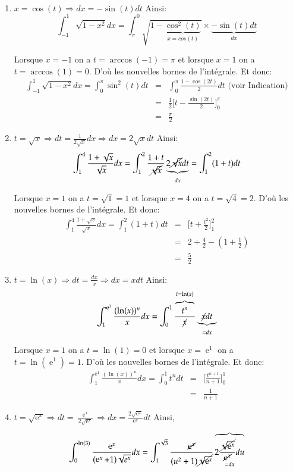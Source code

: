 \documentclass{article}%
\newenvironment{questions}{\begin{enumerate}}{\end{enumerate}}
\DeclareMathOperator{\e}{e} %
\begin{document}
\begin{correction}
  ~\\
  \begin{questions}
  \item $x = \cos(t) \Rightarrow dx = -\sin(t)dt$
    Ainsi:
    \[
      \int_{-1}^{1} \sqrt{1-x^2} dx
      = \int_{\pi}^{0} \sqrt{1-\underbrace{\cos^2(t)}_{x=cos(t)}}
      \times \underbrace{-\sin(t) dt}_{dx} 
    \]

    Lorsque $x=-1$ on a $t = \arccos(-1) = \pi$ et lorsque $x=1$ on a
    $t=\arccos(1) = 0$. D'où les nouvelles bornes de l'intégrale.
    Et donc:
    \begin{eqnarray*} 
      \int_{-1}^{1} \sqrt{1-x^2} dx = \int_0^{\pi} \sin^2(t) dt
      &=& \int_0^{\pi} \frac{1 - \cos(2t)}{2}dt \text{ (voir
          Indication)} \\
      &=& \frac{1}{2}\big[ t - \frac{\sin(2t)}{2} \big]_0^{\pi}\\
      &=& \frac{\pi}{2}
    \end{eqnarray*}
  \item $t=\sqrt{x} \Rightarrow dt = \frac{1}{2\sqrt{x}}dx \Rightarrow dx =
    2\sqrt{x}dt$ Ainsi:
    \[
      \int_{1}^{4} \frac{1+\sqrt{x}}{\sqrt{x}}dx =
      \int_{1}^{2} \frac{1+t}{\cancel{\sqrt{x}}} \underbrace{2
        \cancel{\sqrt{x}} dt}_{dx}
      = \int_{1}^{2} (1+t) dt
    \]
    
    Lorsque $x=1$ on a $t = \sqrt{1} = 1$ et lorsque $x=4$ on a
    $t=\sqrt{4} = 2$. D'où les nouvelles bornes de l'intégrale.
    Et donc:
    \begin{eqnarray*}
      \int_{1}^4 \frac{1+\sqrt{x}}{\sqrt{x}}dx = \int_1^2 (1+t) dt
      &=& \big[ t + \frac{t^2}{2} \big]_1^2 \\
      &=& 2 + \frac{4}{2} - (1 + \frac{1}{2}) \\
      &=& \frac{5}{2}
    \end{eqnarray*}
  \item $ t = \ln(x) \Rightarrow dt = \frac{dx}{x} \Rightarrow dx = x dt$
    Ainsi:
    \[
      \int_1^{\e^1} \frac{(\ln(x))^n}{x}dx = \int_0^1 \frac{\overbrace{t^n}^{t =
          \ln(x)}}{\cancel{x}} \underbrace{\cancel{x} dt}_{=dx}
    \]

    Lorsque $x=1$ on a $t = \ln(1) = 0$ et lorsque $x=\e^1$ on a
    $t=\ln(\e^1) = 1$. D'où les nouvelles bornes de l'intégrale.
    Et donc:
    \begin{eqnarray*}
      \int_1^{\e^1} \frac{(\ln(x))^n}{x} dx = \int_0^1 t^n dt &=& \big[
      \frac{t^{n+1}}{n+1} \big]_0^1 \\
      &=& \frac{1}{n+1}
    \end{eqnarray*}
    \item $t = \sqrt{\e^x} \Rightarrow dt = \frac{\e^x}{2\sqrt{\e^x}}
      \Rightarrow dx = \frac{2\sqrt{\e^x}}{\e^x} dt$ Ainsi,
      \[
        \int_0^{\ln(3)} \frac{ \e^x }{ (\e^x+1) \sqrt{e^x} } dx =
        \int_1^{\sqrt{3}} \frac{ \cancel{\e^x} }{ (u^2+1) \cancel{\sqrt{\e^x}} }
        \overbrace{ 2\frac{\cancel{ \sqrt{\e^x} }}{ \cancel{\e^x} } du}_{=dx}
      \]
      

\end{questions}
\end{correction}
\end{document}
